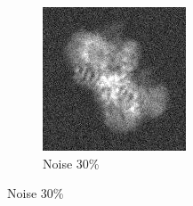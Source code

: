 \documentclass{report}
\begin{document}
\begin{figure}[h]
\begin{subfigure}{.28\textwidth}
\centering
\includegraphics[width=0.8\linewidth]{Emd_4138_proj1_noise_30.jpg}
\captionsetup{justification=centering}
\caption{ Noise 30\%}
\end{subfigure}


\end{figure}
\end{document}
